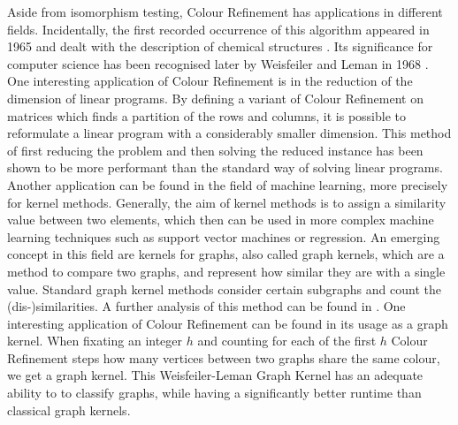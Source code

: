 Aside from isomorphism testing, Colour Refinement has applications in different fields.
Incidentally, the first recorded occurrence of this algorithm appeared in 1965 and dealt with the description of chemical structures \cite{morgan1965GenerationUnique}.
Its significance for computer science has been recognised later by Weisfeiler and Leman in 1968 \cite{weisfeiler1968reduction}.
One interesting application of Colour Refinement is in the reduction of the dimension of linear programs.
By defining a variant of Colour Refinement on matrices which finds a partition of the rows and columns, it is possible to reformulate a linear program with a considerably smaller dimension. 
This method of first reducing the problem and then solving the reduced instance has been shown to be more performant than the standard way of solving linear programs. \cite{grohe2014DimensionReduction}
Another application can be found in the field of machine learning, more precisely for kernel methods.
Generally, the aim of kernel methods is to assign a similarity value between two elements, which then can be used in more complex machine learning techniques such as support vector machines or regression.
An emerging concept in this field are kernels for graphs, also called graph kernels, which are a method to compare two graphs, and represent how similar they are with a single value.
Standard graph kernel methods consider certain subgraphs and count the (dis-)similarities.
A further analysis of this method can be found in \cite{vishwanathan2010graph}.
One interesting application of Colour Refinement can be found in its usage as a graph kernel.
When fixating an integer $h$ and counting for each of the first $h$ Colour Refinement steps how many vertices between two graphs share the same colour, we get a graph kernel.
This Weisfeiler-Leman Graph Kernel has an adequate ability to to classify graphs, while having a significantly better runtime than classical graph kernels. \cite{grohe2021ColorRefinement}

